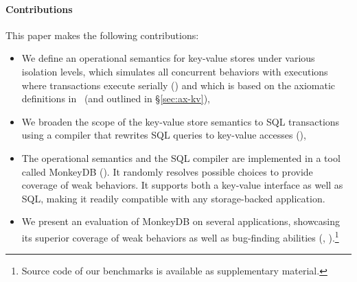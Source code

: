 \paragraph{Contributions}

This paper makes the following contributions:
\begin{itemize}
\item We define an operational semantics for key-value stores under various
  isolation levels, which simulates all concurrent behaviors with executions
  where transactions execute serially () and which is based 
  on the axiomatic definitions in~\cite{DBLP:journals/pacmpl/BiswasE19} (and outlined in \S\ref{sec:ax-kv}),
\item We broaden the scope of the key-value store semantics to SQL transactions
  using a compiler that rewrites SQL queries to key-value accesses (),
\item The operational semantics and the SQL compiler are implemented in a tool
  called MonkeyDB (). It randomly resolves possible choices to provide coverage
  of weak behaviors. It supports both a key-value interface as well as SQL,
  making it readily compatible with any storage-backed application.
\item We present an evaluation of MonkeyDB on several applications, showcasing
its superior coverage of weak behaviors as well as bug-finding abilities
(, ).\footnote{Source code of our benchmarks is available
as supplementary material.}
\end{itemize}



 